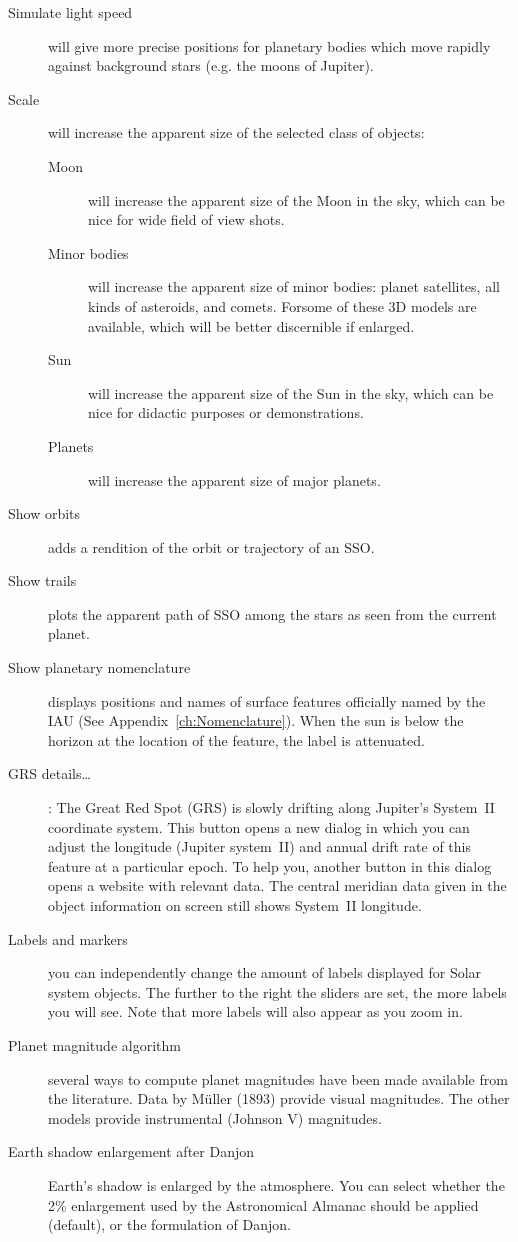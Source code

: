 \begin{description}
\item[Simulate light speed] will give more precise positions for planetary bodies which move
  rapidly against background stars (e.g. the moons of Jupiter).
\item[Scale] will increase the apparent size of the selected class of objects:
  \begin{description}
  \item[Moon] will increase the apparent size of the Moon
  in the sky, which can be nice for wide field of view shots.
  \item[Minor bodies] will increase the apparent size of minor
  bodies: planet satellites, all kinds of asteroids, and comets.  
  Forsome of these 3D models are available, which will be better
  discernible if enlarged.
  \item[Sun] will increase the apparent size of the Sun
    in the sky, which can be nice for didactic purposes or demonstrations.
  \item[Planets] will increase the apparent size of major planets.
  \end{description}
\item[Show orbits] adds a rendition of the orbit or trajectory of an SSO. 
\item[Show trails] plots the apparent path of SSO among the stars as
  seen from the current planet.
\item[Show planetary nomenclature] displays positions and names of
  surface features officially named by the IAU (See
  Appendix~\ref{ch:Nomenclature}). When the sun is below the horizon
  at the location of the feature, the label is attenuated.
\item[GRS details\ldots]: The Great Red Spot (GRS) is slowly
  drifting along Jupiter's System~II coordinate system. This button 
  opens a new dialog in which you can adjust the longitude (Jupiter system~II) 
  and annual drift rate of this feature at a particular epoch. To help you,
  another button in this dialog opens a website with relevant data.
  The central meridian data given
   in the object information on screen still shows
  System~II longitude.
\item[Labels and markers] you can independently change the amount of
  labels displayed for Solar system objects. The further to the
  right the sliders are set, the more labels you will see. Note that
  more labels will also appear as you zoom in.
\item[Planet magnitude algorithm] several ways to compute planet
  magnitudes have been made available from the literature. Data by
  Müller (1893) provide visual magnitudes. The other models provide
  instrumental (Johnson V) magnitudes.
\item[Earth shadow enlargement after Danjon] 
  Earth's shadow is enlarged by the atmosphere. You can select whether
  the 2\% enlargement used by the Astronomical Almanac should be
  applied (default), or the formulation of Danjon.
\end{description}

